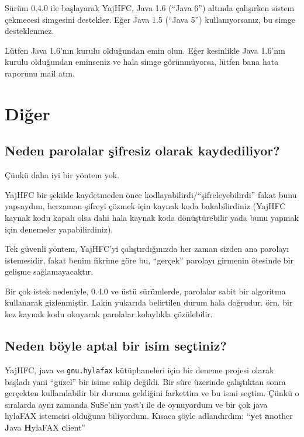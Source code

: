 \documentclass[a4paper,10pt]{scrartcl}
\begin{document}
Sürüm 0.4.0 ile başlayarak YajHFC, Java 1.6 (``Java 6'') altında çalışırken sistem çekmecesi simgesini destekler. Eğer Java 1.5 (``Java 5'') kullanıyorsanız, bu simge desteklenmez.

Lütfen Java 1.6'nın kurulu olduğundan emin olun. Eğer kesinlikle Java 1.6'nın kurulu olduğundan eminseniz ve hala simge görünmüyorsa, lütfen bana hata raporunu mail atın.

\section{Diğer}

\subsection{Neden parolalar şifresiz olarak kaydediliyor?}

Çünkü daha iyi bir yöntem yok.

YajHFC bir şekilde kaydetmeden önce kodlayabilirdi/``şifreleyebilirdi'' fakat
bunu yapsaydım, herzaman şifreyi çözmek için kaynak koda bakabilirdiniz 
(YajHFC kaynak kodu kapalı olsa dahi hala kaynak koda dönüştürebilir 
yada bunu yapmak için denemeler yapabilirdiniz).

Tek güvenli yöntem, YajHFC'yi çalıştırdığınızda her zaman sizden ana parolayı 
istemesidir, fakat benim fikrime göre bu, ``gerçek'' parolayı girmenin ötesinde
bir gelişme sağlamayacaktır.

Bir çok istek nedeniyle, 0.4.0 ve üstü sürümlerde, parolalar sabit bir algoritma kullanarak gizlenmiştir.
Lakin yukarıda belirtilen durum hala doğrudur. örn. bir kez kaynak kodu okuyarak parolalar kolaylıkla çözülebilir.

\subsection{Neden böyle aptal bir isim seçtiniz?}

YajHFC, java ve \texttt{gnu.hylafax} kütüphaneleri için bir deneme projesi olarak başladı
yani ``güzel'' bir isime sahip değildi. Bir süre üzerinde çalıştıktan sonra 
gerçekten kullanılabilir bir duruma geldiğini farkettim ve bu ismi seçtim. 
Çünkü o sıralarda aynı zamanda SuSe'nin yast'ı ile de oynuyordum ve bir çok java hylaFAX istemcisi 
olduğunu biliyordum. Kısaca şöyle adlandırdım:
``\textbf{y}et \textbf{a}nother \textbf{J}ava \textbf{H}ylaFAX \textbf{c}lient''
\end{document}
